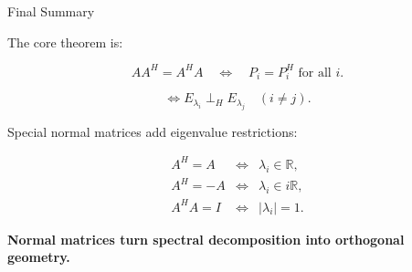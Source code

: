 \documentclass[10pt]{beamer}
\theoremstyle{definition}
\newcommand{\x}[1]{\alert{\textbf{#1}}}
\newcommand{\perpH}{\perp_{H}}
\begin{document}
\begin{frame}{Final Summary}

The core theorem is:

$$
\boxed{AA^H=A^HA}
\quad\Longleftrightarrow\quad
\boxed{P_i=P_i^H\text{ for all }i.}
$$

$$
\Longleftrightarrow
\boxed{E_{\lambda_i}\perpH E_{\lambda_j}\quad(i\ne j).}
$$

\vfill

Special normal matrices add eigenvalue restrictions:

$$
\begin{array}{ccl}
A^H=A &\Longleftrightarrow& \lambda_i\in\mathbb R,\\[0.3em]
A^H=-A &\Longleftrightarrow& \lambda_i\in i\mathbb R,\\[0.3em]
A^HA=I &\Longleftrightarrow& |\lambda_i|=1.
\end{array}
$$

\vfill

\begin{center}
\x{Normal matrices turn spectral decomposition into orthogonal geometry.}
\end{center}

\end{frame}
\end{document}
